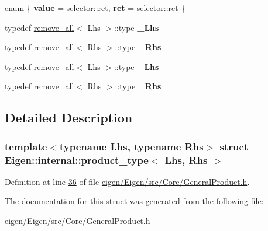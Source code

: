 \begin{DoxyCompactItemize}
enum \{ {\bfseries value} = selector\+:\+:ret, 
{\bfseries ret} = selector\+:\+:ret
 \}
\item 
\mbox{\label{struct_eigen_1_1internal_1_1product__type_a7f952ac5559804440f762d4a23022851}} 
typedef \hyperlink{struct_eigen_1_1internal_1_1remove__all}{remove\+\_\+all}$<$ Lhs $>$\+::type {\bfseries \+\_\+\+Lhs}
\item 
\mbox{\label{struct_eigen_1_1internal_1_1product__type_a9c54100f6497ba2a60be9779c5dda2c2}} 
typedef \hyperlink{struct_eigen_1_1internal_1_1remove__all}{remove\+\_\+all}$<$ Rhs $>$\+::type {\bfseries \+\_\+\+Rhs}
\item 
\mbox{\label{struct_eigen_1_1internal_1_1product__type_a7f952ac5559804440f762d4a23022851}} 
typedef \hyperlink{struct_eigen_1_1internal_1_1remove__all}{remove\+\_\+all}$<$ Lhs $>$\+::type {\bfseries \+\_\+\+Lhs}
\item 
\mbox{\label{struct_eigen_1_1internal_1_1product__type_a9c54100f6497ba2a60be9779c5dda2c2}} 
typedef \hyperlink{struct_eigen_1_1internal_1_1remove__all}{remove\+\_\+all}$<$ Rhs $>$\+::type {\bfseries \+\_\+\+Rhs}
\end{DoxyCompactItemize}


\subsection{Detailed Description}
\subsubsection*{template$<$typename Lhs, typename Rhs$>$\newline
struct Eigen\+::internal\+::product\+\_\+type$<$ Lhs, Rhs $>$}



Definition at line \hyperlink{eigen_2_eigen_2src_2_core_2_general_product_8h_source_l00036}{36} of file \hyperlink{eigen_2_eigen_2src_2_core_2_general_product_8h_source}{eigen/\+Eigen/src/\+Core/\+General\+Product.\+h}.



The documentation for this struct was generated from the following file\+:\begin{DoxyCompactItemize}
\item 
eigen/\+Eigen/src/\+Core/\+General\+Product.\+h\end{DoxyCompactItemize}
